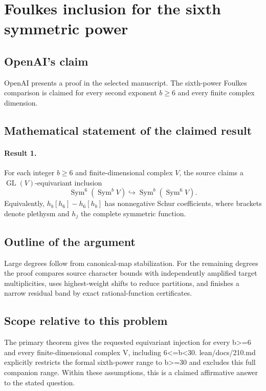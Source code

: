 \documentclass[11pt]{article}
\begin{document}
\section*{Foulkes inclusion for the sixth symmetric power}

\subsection{OpenAI's claim}
OpenAI presents a proof in the selected manuscript. The sixth-power Foulkes comparison is claimed for every second exponent $b\geq6$ and every finite complex dimension.

\subsection{Mathematical statement of the claimed result}
\paragraph{Result 1.} For each integer \(b\ge6\) and finite-dimensional complex \(V\), the source claims a \(\operatorname{GL}(V)\)-equivariant inclusion
\[
 \operatorname{Sym}^6(\operatorname{Sym}^bV)
 \hookrightarrow\operatorname{Sym}^b(\operatorname{Sym}^6V).
\]
Equivalently, \(h_b[h_6]-h_6[h_b]\) has nonnegative Schur coefficients, where brackets denote plethysm and \(h_j\) the complete symmetric function.

\subsection{Outline of the argument}
Large degrees follow from canonical-map stabilization. For the remaining degrees the proof compares source character bounds with independently amplified target multiplicities, uses highest-weight shifts to reduce partitions, and finishes a narrow residual band by exact rational-function certificates.

\subsection{Scope relative to this problem}
The primary theorem gives the requested equivariant injection for every b>=6 and every finite-dimensional complex V, including 6<=b<30. lean/docs/210.md explicitly restricts the formal sixth-power range to b>=30 and excludes this full companion range. Within these assumptions, this is a claimed affirmative answer to the stated question.
\end{document}
